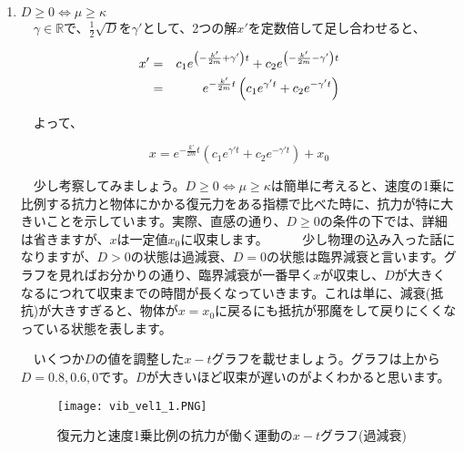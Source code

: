 \begin{enumerate}
    \item $D\geq 0 \Leftrightarrow \mu \geq \kappa$\\
            　$\gamma\in\mathbb{R}$で、$\frac{1}{2}\sqrt{D}$を$\gamma'$として、2つの解$x'$を定数倍して足し合わせると、
            
            \begin{eqnarray}
                x' &=& c_1 e^{\left(-\frac{k'}{2m}+\gamma'\right)t} + c_2 e^{\left(-\frac{k'}{2m}-\gamma'\right)t} \notag \\
                   &=& e^{-\frac{k'}{2m}t}\left(c_1e^{\gamma't}+c_2e^{-\gamma't}\right) \notag
            \end{eqnarray}
            
            　よって、
            
            \begin{equation}
                x=e^{-\frac{k'}{2m}t}\left(c_1e^{\gamma't}+c_2e^{-\gamma't}\right)+x_0
            \end{equation}
            
            　少し考察してみましょう。$D\geq 0 \Leftrightarrow \mu \geq \kappa$は簡単に考えると、速度の1乗に比例する抗力と物体にかかる復元力をある指標で比べた時に、抗力が特に大きいことを示しています。実際、直感の通り、$D\geq 0$の条件の下では、詳細は省きますが、$x$は一定値$x_0$に収束します。
            　
            　少し物理の込み入った話になりますが、$D>0$の状態は過減衰、$D=0$の状態は臨界減衰と言います。グラフを見ればお分かりの通り、臨界減衰が一番早く$x$が収束し、$D$が大きくなるにつれて収束までの時間が長くなっていきます。これは単に、減衰(抵抗)が大きすぎると、物体が$x=x_0$に戻るにも抵抗が邪魔をして戻りにくくなっている状態を表します。
            
            　いくつか$D$の値を調整した$x-t$グラフを載せましょう。グラフは上から$D=0.8,0.6,0$です。$D$が大きいほど収束が遅いのがよくわかると思います。
            
            \begin{figure}[!ht]
              \centering
              \texttt{[image: vib\_vel1\_1.PNG]}
              \caption{復元力と速度1乗比例の抗力が働く運動の$x-t$グラフ(過減衰)}
              \label{fig:vib_vel1_1}
            \end{figure}
            \fi
            

\end{enumerate}
